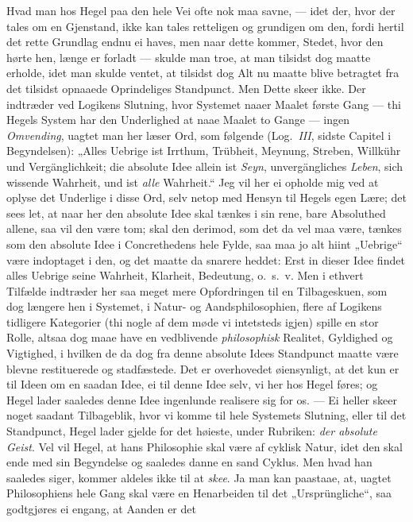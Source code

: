 \documentclass[12pt,a4paper]{book}
\newcommand{\apage}[1]{\marginnote{\footnotesize\textit{[#1]}}}
\begin{document}
\apage{42} Hvad man hos Hegel paa den hele Vei ofte nok maa savne, --- idet der,
hvor der tales om en Gjenstand, ikke kan tales retteligen og grundigen
om den, fordi hertil det rette Grundlag endnu ei haves, men naar dette
kommer, Stedet, hvor den hørte hen, længe er forladt --- skulde man
troe, at man tilsidst dog maatte erholde, idet man skulde ventet, at
tilsidst dog Alt nu maatte blive betragtet fra det tilsidst opnaaede
Oprindeliges Standpunct. Men Dette skeer ikke. Der indtræder ved
Logikens Slutning, hvor Systemet naaer Maalet første Gang --- thi
Hegels System har den Underlighed at naae Maalet to Gange --- ingen
\emph{Omvending}, uagtet man her læser Ord, som følgende (Log.\ \textit{III}, sidste
Capitel i Begyndelsen): „Alles Uebrige ist Irrthum, Trübheit, Meynung,
Streben, Willkühr und Vergänglichkeit; die absolute Idee allein ist
\emph{Seyn}, unvergängliches \emph{Leben}, sich wissende Wahrheit, und ist \emph{alle}
Wahrheit.“ Jeg vil her ei opholde mig ved at oplyse det Underlige i
disse Ord, selv netop med Hensyn til Hegels egen Lære; det sees let, at
naar her den absolute Idee skal tænkes i sin rene, bare Absoluthed
allene, saa vil den være tom; skal den derimod, som det da vel maa
være, tænkes som den absolute Idee i Concrethedens hele Fylde, saa maa
jo alt hiint „Uebrige“ være indoptaget i den, og det maatte da snarere
heddet: Erst in dieser Idee findet alles Uebrige seine Wahrheit,
Klarheit, Bedeutung, o.\ s.\ v. Men i ethvert Tilfælde indtræder her
saa meget mere Opfordringen til en Tilbageskuen, som dog længere hen i
Systemet, i Natur- og Aandsphilosophien, flere af Logikens tidligere
Kategorier (thi nogle af dem møde vi intetsteds igjen) spille en stor
Rolle, altsaa dog maae have en vedblivende \emph{philosophisk}
Realitet, Gyldighed og Vigtighed, i hvilken de da dog fra denne
absolute Idees Standpunct maatte være blevne restituerede og
stadfæstede. Det er overhovedet øiensynligt, at det kun er til Ideen om
en saadan Idee, ei til denne Idee selv, vi her hos Hegel føres; og
Hegel lader saaledes denne Idee ingenlunde realisere sig for \apage{43} os. ---
Ei heller skeer noget saadant Tilbageblik, hvor vi komme til hele
Systemets Slutning, eller til det Standpunct, Hegel lader gjelde for
det høieste, under Rubriken: \emph{der absolute Geist}. Vel vil Hegel, at
hans Philosophie skal være af cyklisk Natur, idet den skal ende med
sin Begyndelse og saaledes danne en sand Cyklus. Men hvad han
saaledes siger, kommer aldeles ikke til at \emph{skee}. Ja man kan paastaae,
at, uagtet Philosophiens hele Gang skal være en Henarbeiden til det
„Ursprüngliche“, saa godtgjøres ei engang, at Aanden er det
\end{document}
